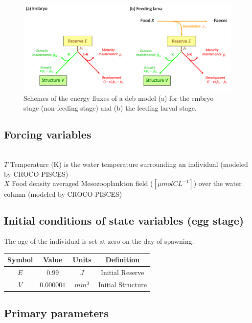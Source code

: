\begin{figure}[ht]
	\includegraphics[width=1.0\textwidth]{figures/S1DEBflux.png}
	\centering
	\caption{Schemes of the energy fluxes of a \acrlong{deb} model (a) for the embryo stage (non-feeding stage) and (b) the feeding larval stage.}
	\label{S1DEBflux}
\end{figure}

\subsection*{Forcing variables}
\hfill \\

$T$ Temperature (K) is the water temperature surrounding an individual (modeled by CROCO-PISCES)\\

$X$ Food density averaged Mesozooplankton field ($\left[ \mu mol CL^{-1} \right]$) over the water column (modeled by CROCO-PISCES)\\

\subsection*{Initial conditions of state variables (egg stage)}

The age of the individual is set at zero on the day of spawning.\\

\begin{tabular}{|c|c|c|c|}
\hline 
Symbol  & Value      & Units  & Definition      \\ 
\hline 
$E$     & $0.99$     & $J$    & Initial Reserve \\ 
$V$     & $0.000001$ & $mm^3$ & Initial Structure\\
\hline 
\end{tabular} 

\subsection*{Primary parameters}

